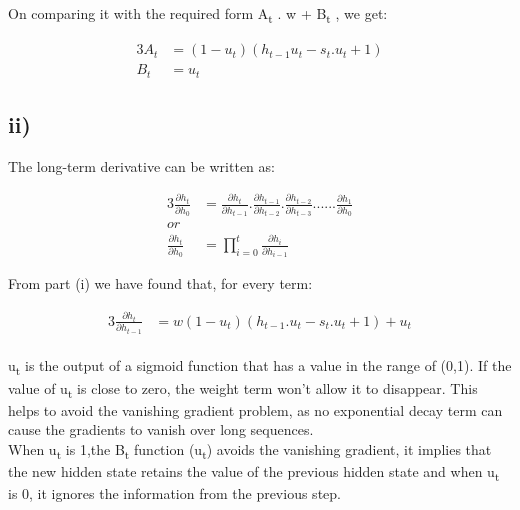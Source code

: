 On comparing it with the required form A\textsubscript{t} . w + B\textsubscript{t} , we get:

\begin{alignat}{3}
A_t &= (1-u_t)(h_{t-1}u_t - s_t.u_t+1)
\\B_t &= u_t
\end{alignat}

\subsection*{ii)}

The long-term derivative can be written as:

\begin{alignat}{3}
\frac {\partial h_t}{\partial h_0} &= \frac {\partial h_t}{\partial h_{t-1}} . \frac {\partial h_{t-1}}{\partial h_{t-2}}. \frac {\partial h_{t-2}}{\partial h_{t-3}}...... \frac {\partial h_1}{\partial h_0} 
\\or
\\
\frac {\partial h_t}{\partial h_0} &= \prod_{i=0}^{t} \frac{\partial h_i}{\partial h_{i-1}}
\end{alignat}

From part (i) we have found that, for every term:

\begin{alignat}{3}
\frac {\partial h_t}{\partial h_{t-1}} &= w(1-u_t)(h_{t-1}.u_t-s_t.u_t +1) + u_t
\end{alignat}\\
u\textsubscript{t} is the output of a sigmoid function that has a value in the range of (0,1). If the value of u\textsubscript{t} is close to zero, the weight term won’t allow it to disappear. This helps to avoid the vanishing gradient problem, as no exponential decay term can cause the gradients to vanish over long sequences.\\
When u\textsubscript{t} is 1,the B\textsubscript{t} function (u\textsubscript{t}) avoids the vanishing gradient, it implies that the new hidden state retains the value of the previous hidden state and when u\textsubscript{t} is 0, it ignores the information from the previous step.




